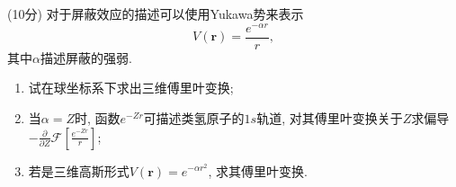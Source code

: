 \documentclass{njustexam}
\begin{document}





\begin{problem}{(10分)}
    对于屏蔽效应的描述可以使用Yukawa势来表示
$$
V(\mathbf{r}) = \frac{e^{-\alpha r}}{r},
$$
其中$\alpha$描述屏蔽的强弱.
\begin{enumerate}
  \item[(a)] 试在球坐标系下求出三维傅里叶变换;
  \item[(b)] 当$\alpha=Z$时, 函数$e^{-Zr}$可描述类氢原子的$1s$轨道, 对其傅里叶变换关于$Z$求偏导
  $-\frac{\partial}{\partial Z} \mathcal{F} \left[ \frac{e^{-Z r}}{r}\right]$;
  \item[(c)] 若是三维高斯形式$V(\mathbf{r}) = e^{-\alpha r^2}$, 求其傅里叶变换.
\end{enumerate}
\end{problem}

\begin{solution}

\end{solution}

\end{document}
